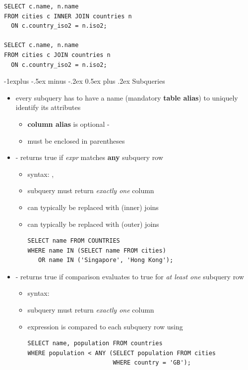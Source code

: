 \documentclass[10pt, landscape]{article}
\makeatletter
\renewcommand{\subsection}{\@startsection{subsection}{2}{0mm}%
  {-1explus -.5ex minus -.2ex}%
  {0.5ex plus .2ex}%
{\normalfont\normalsize\bfseries}}
\makeatother
\begin{document}
\begin{multicols}{3}
\begin{itemize}
\begin{lstlisting}[style=mySQL]
SELECT c.name, n.name
FROM cities c INNER JOIN countries n
  ON c.country_iso2 = n.iso2;

SELECT c.name, n.name
FROM cities c JOIN countries n
  ON c.country_iso2 = n.iso2;
      \end{lstlisting}
  \end{itemize}

  \subsection{Subqueries}
  \begin{itemize}
    \item {} every subquery has to have a name (mandatory \textbf{table alias}) to uniquely identify its attributes
      \begin{itemize}
        \item \textbf{column alias} is optional - 
        \item must be enclosed in parentheses
      \end{itemize}

    \item {} - returns true if \textit{expr} matches \textbf{any} subquery row
      \begin{itemize}
        \item syntax: , 
        \item subquery must return \textit{exactly one} column
        \item {} can typically be replaced with (inner) joins
        \item {} can typically be replaced with (outer) joins
          \begin{lstlisting}[style=mySQL]
SELECT name FROM COUNTRIES
WHERE name IN (SELECT name FROM cities)
   OR name IN ('Singapore', 'Hong Kong');
          \end{lstlisting}
      \end{itemize}

    \item {} - returns true if comparison evaluates to true for \textit{at least one} subquery row
      \begin{itemize}
        \item syntax: 
        \item subquery must return \textit{exactly one} column
        \item expression is compared to each subquery row using  
          \begin{lstlisting}[style=mySQL]
SELECT name, population FROM countries 
WHERE population < ANY (SELECT population FROM cities
                        WHERE country = 'GB');
          \end{lstlisting}
      \end{itemize}


\end{itemize}
\end{multicols}
\end{document}
